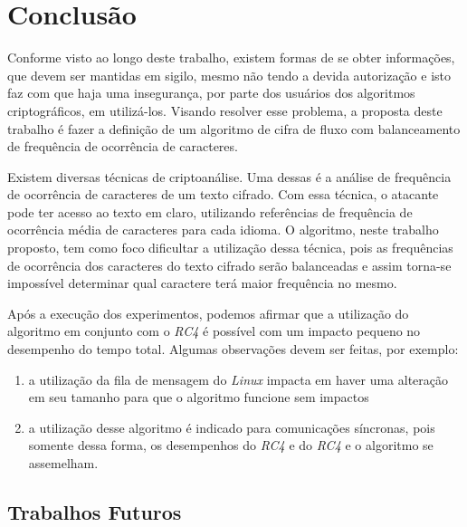 \chapter{Conclusão}
\label{conclusion}


Conforme visto ao longo deste trabalho, existem formas de se obter informações, que devem ser mantidas em sigilo, mesmo não tendo a devida autorização e isto faz com que haja uma insegurança, por parte dos usuários dos algoritmos criptográficos, em utilizá-los. Visando resolver esse problema, a proposta deste trabalho é fazer a definição de um algoritmo de cifra de fluxo com balanceamento de frequência de ocorrência de caracteres.

Existem diversas técnicas de criptoanálise. Uma dessas é a análise de frequência de ocorrência de caracteres de um texto cifrado. Com essa técnica, o atacante pode ter acesso ao texto em claro, utilizando referências de frequência de ocorrência média de caracteres para cada idioma. O algoritmo, neste trabalho proposto, tem como foco dificultar a utilização dessa técnica, pois as frequências de ocorrência dos caracteres do texto cifrado serão balanceadas e assim torna-se impossível determinar qual caractere terá maior frequência no mesmo.

Após a execução dos experimentos, podemos afirmar que a utilização do algoritmo em conjunto com o \textit{RC4} é possível com um impacto pequeno no desempenho do tempo total. Algumas observações devem ser feitas, por exemplo:

\begin{enumerate}
	\item a utilização da fila de mensagem do \textit{Linux} impacta em haver uma alteração em seu tamanho para que o algoritmo funcione sem impactos
	\item a utilização desse algoritmo é indicado para comunicações síncronas, pois somente dessa forma, os desempenhos do \textit{RC4} e do \textit{RC4} e o algoritmo se assemelham. 
\end{enumerate}

\section{Trabalhos Futuros}
\label{future-work}

